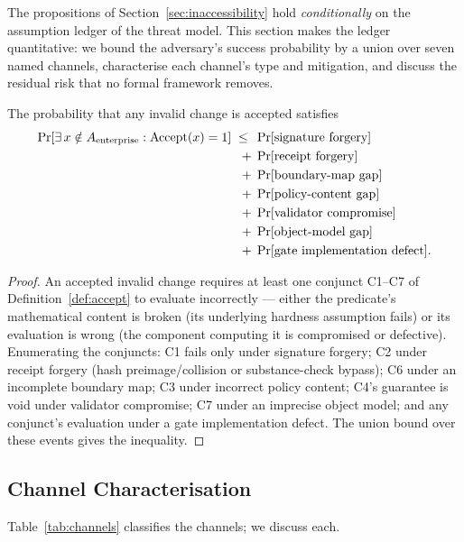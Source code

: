 The propositions of Section~\ref{sec:inaccessibility} hold \emph{conditionally}
on the assumption ledger of the threat model. This section makes the ledger
quantitative: we bound the adversary's success probability by a union over
seven named channels, characterise each channel's type and mitigation, and
discuss the residual risk that no formal framework removes.

\begin{theorem}
\label{thm:decomp}
The probability that any invalid change is accepted satisfies
\begin{align*}
  \Pr[\exists\, x \notin A_{\mathrm{enterprise}} : \operatorname{Accept}(x) = 1] \;\leq\;\;
  &\Pr[\textnormal{signature forgery}] \\
  +\;&\Pr[\textnormal{receipt forgery}] \\
  +\;&\Pr[\textnormal{boundary-map gap}] \\
  +\;&\Pr[\textnormal{policy-content gap}] \\
  +\;&\Pr[\textnormal{validator compromise}] \\
  +\;&\Pr[\textnormal{object-model gap}] \\
  +\;&\Pr[\textnormal{gate implementation defect}].
\end{align*}
\end{theorem}
\begin{proof}
An accepted invalid change requires at least one conjunct C1--C7 of
Definition~\ref{def:accept} to evaluate incorrectly --- either the predicate's
mathematical content is broken (its underlying hardness assumption fails) or
its evaluation is wrong (the component computing it is compromised or
defective). Enumerating the conjuncts: C1 fails only under signature forgery;
C2 under receipt forgery (hash preimage/collision or substance-check bypass);
C6 under an incomplete boundary map; C3 under incorrect policy content; C4's
guarantee is void under validator compromise; C7 under an imprecise object
model; and any conjunct's evaluation under a gate implementation defect. The
union bound over these events gives the inequality.
\end{proof}

\subsection{Channel Characterisation}
\label{sec:channels}

Table~\ref{tab:channels} classifies the channels; we discuss each.

